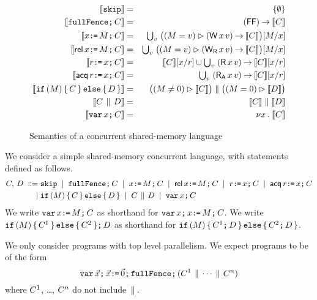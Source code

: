 \begin{figure*}
\begin{eqnarray*}
  \sem{\SKIP} & = & \{ \emptyset \} \\
  \sem{\FENCE\SEMI \aCmd} & = & (\DF) \prefix \sem{\aCmd} \\
  \sem{\aLoc\GETS\aExp\SEMI \aCmd} & = & \textstyle\bigcup_\aVal\; \bigl((\aExp=\aVal) \guard (\DW\aLoc\aVal) \prefix \sem{\aCmd}\bigr)[\aExp/\aLoc] \\
  \sem{\REL\aLoc\GETS\aExp\SEMI \aCmd} & = & \textstyle\bigcup_\aVal\; \bigl((\aExp=\aVal) \guard (\DWRel\aLoc\aVal) \prefix \sem{\aCmd}\bigr)[\aExp/\aLoc] \\
  \sem{\aReg\GETS\aLoc\SEMI \aCmd} & = & \sem{\aCmd}[\aLoc/\aReg] \cup \textstyle\bigcup_\aVal\; (\DR\aLoc\aVal) \prefix \sem{\aCmd}[\aLoc/\aReg] \\
  \sem{\ACQ\aReg\GETS\aLoc\SEMI \aCmd} & = & \textstyle\bigcup_\aVal\; (\DRAcq\aLoc\aVal) \prefix \sem{\aCmd}[\aLoc/\aReg] \\
  \sem{\IF (\aExp) \THEN \aCmd \ELSE \bCmd \FI} & = & \bigl((\aExp \neq 0) \guard \sem{\aCmd}\bigr) \parallel \bigl((\aExp=0) \guard \sem{\bCmd}\bigr) \\
  \sem{\aCmd \PAR \bCmd} & = & \sem{\aCmd} \parallel \sem{\bCmd} \\
  \sem{\VAR\aLoc\SEMI \aCmd} & = & \nu \aLoc \st \sem{\aCmd}
\end{eqnarray*}
\caption{Semantics of a concurrent shared-memory language}
\label{fig:programs}
\end{figure*}

We consider a simple shared-memory concurrent language, with statements defined as follows.
\begin{align*}
C,\,D
\;\mathrel{\mathord{\vcentcolon}\mkern-1mu\mathord{\vcentcolon}\mathord{{=}}}\;& \texttt{skip}
\;\mathrel{|}\; \texttt{fullFence}\texttt{;}\, C
\;\mathrel{|}\; x\texttt{:}\mkern-1mu\texttt{=}\,M\texttt{;}\, C
\;\mathrel{|}\; \mathsf{rel}\,x\texttt{:}\mkern-1mu\texttt{=}\,M\texttt{;}\, C
\;\mathrel{|}\; r\texttt{:}\mkern-1mu\texttt{=}\,x\texttt{;}\, C
\;\mathrel{|}\; \mathsf{acq}\,r\texttt{:}\mkern-1mu\texttt{=}\,x\texttt{;}\, C \\
\;\mathrel{|}\;& \texttt{if}\, (M) \,\{\, C \,\}\,\texttt{else}\,\{\, D \,\}
\;\mathrel{|}\; C \,\mathbin{\|}\, D
\;\mathrel{|}\; \texttt{var}\,x\texttt{;}\, C
\end{align*}
We write $\texttt{var}\,x\texttt{:}\mkern-1mu\texttt{=}\,M\texttt{;}\, C$ as shorthand for $\texttt{var}\,x\texttt{;}\,x\texttt{:}\mkern-1mu\texttt{=}\,M\texttt{;}\, C$.
We write $\texttt{if}\, (M) \,\{\, C^1 \,\}\,\texttt{else}\,\{\, C^2 \,\} \texttt{;}\, D$ as
shorthand for $\texttt{if}\, (M) \,\{\, C^1 \texttt{;}\, D\,\}\,\texttt{else}\,\{\, C^2 \texttt{;}\, D\,\}$.

We only consider programs with top level parallelism.   We expect programs to
be of the form
\begin{displaymath}
  \texttt{var}\,\vec{x}\texttt{;}\,
  \vec{x}\texttt{:}\mkern-1mu\texttt{=}\,\vec{0}\texttt{;}\,
  \texttt{fullFence}\texttt{;}\,
  (C^1 \,\mathbin{\|}\, \cdots \,\mathbin{\|}\, C^n)
\end{displaymath}
where $C^1$, \ldots, $C^n$ do not include $\,\mathbin{\|}\,$.

